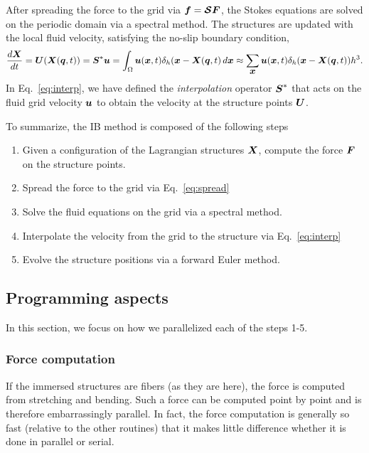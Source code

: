 \documentclass[]{article}
\newcommand{\bm}[1]{\mbox{\boldmath $ #1 $}}    %
\begin{document}
After spreading the force to the grid via $\bm{f}=\bm{\mathcal{S}}\bm{F}$, the Stokes equations are solved on the periodic domain via a spectral method. The structures are updated with the local fluid velocity, satisfying the no-slip boundary condition,
\begin{equation}
\label{eq:interp}
\frac{d \bm{X}}{dt} = \bm{U}(\bm{X}(\bm{q},t)) =\bm{S}^* \bm{u} = \int_{\Omega} \bm{u} (\bm{x},t) \delta_h(\bm{x}-\bm{X}(\bm{q},t)\, d\bm{x} \approx \sum_{\bm{x}} \bm{u}(\bm{x},t) \delta_h (\bm{x} - \bm{X}(\bm{q},t)) h^3. 
\end{equation}
In Eq.\ \eqref{eq:interp}, we have defined the \textit{interpolation} operator $\bm{S}^*$ that acts on the fluid grid velocity $\bm{u}$ to obtain the velocity at the structure points $\bm{U}$. 

To summarize, the IB method is composed of the following steps
\begin{enumerate}
\item Given a configuration of the Lagrangian structures $\bm{X}$, compute the force $\bm{F}$ on the structure points. 
\item Spread the force to the grid via Eq.\ \eqref{eq:spread}
\item Solve the fluid equations on the grid via a spectral method. 
\item Interpolate the velocity from the grid to the structure via Eq.\ \eqref{eq:interp}
\item Evolve the structure positions via a forward Euler method. 
\end{enumerate}

\subsection{Programming aspects}
In this section, we focus on how we parallelized each of the steps 1-5. 

\subsubsection{Force computation}
If the immersed structures are fibers (as they are here), the force is computed from stretching and bending. Such a force can be computed point by point and is therefore embarrassingly parallel. In fact, the force computation is generally so fast (relative to the other routines) that it makes little difference whether it is done in parallel or serial. 
\end{document}
